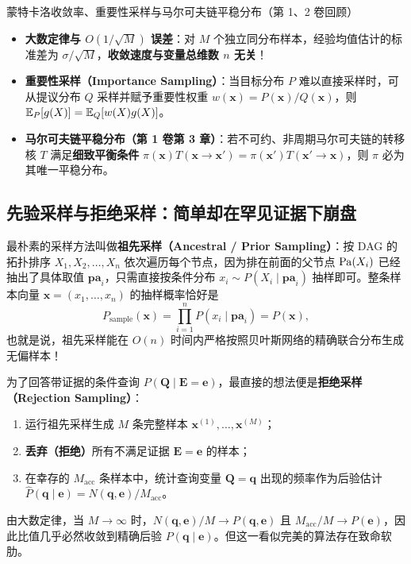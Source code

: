 \begin{recallBox}{蒙特卡洛收敛率、重要性采样与马尔可夫链平稳分布（第 1、2 卷回顾）}
\begin{itemize}
  \item \textbf{大数定律与 $O(1/\sqrt{M})$ 误差}：对 $M$ 个独立同分布样本，经验均值估计的标准差为 $\sigma/\sqrt{M}$，\textbf{收敛速度与变量总维数 $n$ 无关}！
  \item \textbf{重要性采样（Importance Sampling）}：当目标分布 $P$ 难以直接采样时，可从提议分布 $Q$ 采样并赋予重要性权重 $w(\mathbf{x}) = P(\mathbf{x})/Q(\mathbf{x})$，则 $\mathbb{E}_P[g(X)] = \mathbb{E}_Q[w(X)g(X)]$。
  \item \textbf{马尔可夫链平稳分布（第 1 卷第 3 章）}：若不可约、非周期马尔可夫链的转移核 $T$ 满足\textbf{细致平衡条件} $\pi(\mathbf{x}) T(\mathbf{x}\to \mathbf{x}') = \pi(\mathbf{x}') T(\mathbf{x}'\to \mathbf{x})$，则 $\pi$ 必为其唯一平稳分布。
\end{itemize}
\end{recallBox}

\subsection{先验采样与拒绝采样：简单却在罕见证据下崩盘}

最朴素的采样方法叫做\textbf{祖先采样（Ancestral / Prior Sampling）}：按 DAG 的拓扑排序 $X_1, X_2, \dots, X_n$ 依次遍历每个节点，因为排在前面的父节点 $\operatorname{Pa}(X_i)$ 已经抽出了具体取值 $\mathbf{pa}_i$，只需直接按条件分布 $x_i \sim P(X_i \mid \mathbf{pa}_i)$ 抽样即可。整条样本向量 $\mathbf{x} = (x_1,\dots,x_n)$ 的抽样概率恰好是
\[
  P_{\text{sample}}(\mathbf{x}) = \prod_{i=1}^{n} P(x_i \mid \mathbf{pa}_i) = P(\mathbf{x}),
\]
也就是说，祖先采样能在 $O(n)$ 时间内严格按照贝叶斯网络的精确联合分布生成无偏样本！

为了回答带证据的条件查询 $P(\mathbf{Q} \mid \mathbf{E}=\mathbf{e})$，最直接的想法便是\textbf{拒绝采样（Rejection Sampling）}：
\begin{enumerate}
  \item 运行祖先采样生成 $M$ 条完整样本 $\mathbf{x}^{(1)}, \dots, \mathbf{x}^{(M)}$；
  \item \textbf{丢弃（拒绝）}所有不满足证据 $\mathbf{E} = \mathbf{e}$ 的样本；
  \item 在幸存的 $M_{\text{acc}}$ 条样本中，统计查询变量 $\mathbf{Q} = \mathbf{q}$ 出现的频率作为后验估计 $\hat{P}(\mathbf{q}\mid \mathbf{e}) = N(\mathbf{q}, \mathbf{e}) / M_{\text{acc}}$。
\end{enumerate}
由大数定律，当 $M \to \infty$ 时，$N(\mathbf{q}, \mathbf{e})/M \to P(\mathbf{q}, \mathbf{e})$ 且 $M_{\text{acc}}/M \to P(\mathbf{e})$，因此比值几乎必然收敛到精确后验 $P(\mathbf{q}\mid \mathbf{e})$。但这一看似完美的算法存在致命软肋。

